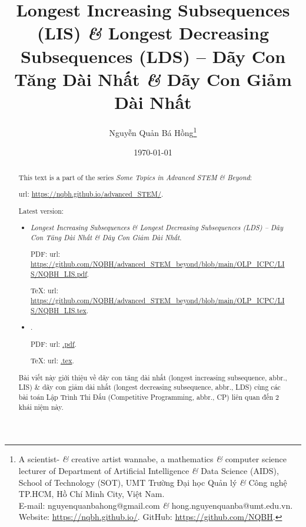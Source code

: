 \documentclass{article}
\title{Longest Increasing Subsequences (LIS) {\it\&} Longest Decreasing Subsequences (LDS) -- Dãy Con Tăng Dài Nhất {\it\&} Dãy Con Giảm Dài Nhất}
\author{Nguyễn Quản Bá Hồng\footnote{A scientist- {\it\&} creative artist wannabe, a mathematics {\it\&} computer science lecturer of Department of Artificial Intelligence {\it\&} Data Science (AIDS), School of Technology (SOT), UMT Trường Đại học Quản lý {\it\&} Công nghệ TP.HCM, Hồ Chí Minh City, Việt Nam.\\E-mail: {\sf nguyenquanbahong@gmail.com} {\it\&} {\sf hong.nguyenquanba@umt.edu.vn}. Website: \url{https://nqbh.github.io/}. GitHub: \url{https://github.com/NQBH}.}}
\date{\today}
\begin{document}
\maketitle
\begin{abstract}
    This text is a part of the series {\it Some Topics in Advanced STEM \& Beyond}:

    {\sc url}: \url{https://nqbh.github.io/advanced_STEM/}.

    Latest version:
    \begin{itemize}
        \item {\it Longest Increasing Subsequences \& Longest Decreasing Subsequences (LDS) -- Dãy Con Tăng Dài Nhất \& Dãy Con Giảm Dài Nhất}.

        PDF: {\sc url}: \url{https://github.com/NQBH/advanced_STEM_beyond/blob/main/OLP_ICPC/LIS/NQBH_LIS.pdf}.

        \TeX: {\sc url}: \url{https://github.com/NQBH/advanced_STEM_beyond/blob/main/OLP_ICPC/LIS/NQBH_LIS.tex}.
        \item {\it }.

        PDF: {\sc url}: \url{.pdf}.

        \TeX: {\sc url}: \url{.tex}.
    \end{itemize}
    Bài viết này giới thiệu về dãy con tăng dài nhất (longest increasing subsequence, abbr., LIS) \& dãy con giảm dài nhất (longest decreasing subsequence, abbr., LDS) cùng các bài toán Lập Trình Thi Đấu (Competitive Programming, abbr., CP) liên quan đến 2 khái niệm này.
\end{abstract}
\tableofcontents

\end{document}
